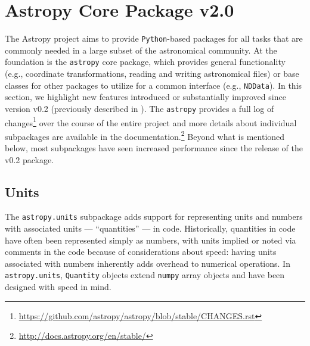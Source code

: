 \documentclass[modern]{aastex61}
\newcommand{\package}[1]{\texttt{#1}\xspace}
\newcommand{\python}{\package{Python}}
\newcommand{\astropy}{Astropy\xspace}
\newcommand{\astropypkg}{\package{astropy}}
\newcommand{\inlinecomment}[2]{\todo[inline]{#1: #2}\xspace}
\begin{document}
\section{Astropy Core Package v2.0}
\label{sec:core}
The \astropy project aims to provide \python-based packages for all tasks that
are commonly needed in a large subset of the astronomical community.
At the foundation is the \astropypkg core package, which provides general
functionality (e.g., coordinate transformations, reading and writing astronomical
files) or base classes for other
packages to utilize for a common interface (e.g., \texttt{NDData}).
In this section, we highlight new features introduced or substantially improved
since version v0.2 (previously described in \citealt{astropy}).  The \astropypkg
provides a full log of changes\footnote{\url{https://github.com/astropy/astropy/blob/stable/CHANGES.rst}}
over the course of the entire project and more details about individual
subpackages are available in the documentation.\footnote{\url{http://docs.astropy.org/en/stable/}}
Beyond what is mentioned below, most subpackages have seen increased performance
since the release of the v0.2 package.



\subsection{Units}\label{sec:units}

The \texttt{astropy.units} subpackage adds support for representing units and
numbers with associated units --- ``quantities'' --- in code.
Historically, quantities in code have often been represented simply as numbers,
with units implied or noted via comments in the code because of considerations
about speed: having units associated with numbers inherently adds overhead to
numerical operations.
In \texttt{astropy.units}, \texttt{Quantity} objects extend \texttt{numpy}
array objects and have been designed with speed in mind.
\end{document}
